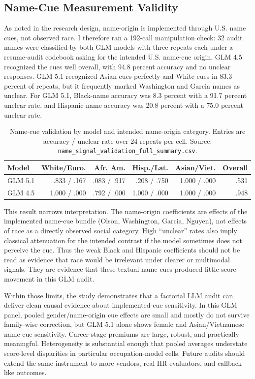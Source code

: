 \documentclass[10pt,twocolumn,letterpaper]{article}
\begin{document}
\subsection{Name-Cue Measurement Validity}

As noted in the research design, name-origin is implemented through U.S. name cues, not observed race. I therefore ran a 192-call manipulation check: 32 audit names were classified by both GLM models with three repeats each under a resume-audit codebook asking for the intended U.S. name-cue origin. GLM 4.5 recognized the cues well overall, with 94.8 percent accuracy and no unclear responses. GLM 5.1 recognized Asian cues perfectly and White cues in 83.3 percent of repeats, but it frequently marked Washington and Garcia names as unclear. For GLM 5.1, Black-name accuracy was 8.3 percent with a 91.7 percent unclear rate, and Hispanic-name accuracy was 20.8 percent with a 75.0 percent unclear rate.

\begin{table}[t]
\centering
\caption{Name-cue validation by model and intended name-origin category. Entries are accuracy / unclear rate over 24 repeats per cell. Source: \texttt{name\_signal\_validation\_full\_summary.csv}.}
\label{tab:namevalid}
\scriptsize
\begin{tabular}{lrrrrr}
\toprule
Model & White/Euro. & Afr. Am. & Hisp./Lat. & Asian/Viet. & Overall \\
\midrule
GLM 5.1 & .833 / .167 & .083 / .917 & .208 / .750 & 1.000 / .000 & .531 \\
GLM 4.5 & 1.000 / .000 & .792 / .000 & 1.000 / .000 & 1.000 / .000 & .948 \\
\bottomrule
\end{tabular}
\end{table}

This result narrows interpretation. The name-origin coefficients are effects of the implemented name-cue bundle (Olson, Washington, Garcia, Nguyen), not effects of race as a directly observed social category. High ``unclear'' rates also imply classical attenuation for the intended contrast if the model sometimes does not perceive the cue. Thus the weak Black and Hispanic coefficients should not be read as evidence that race would be irrelevant under clearer or multimodal signals. They are evidence that these textual name cues produced little score movement in this GLM audit.

Within those limits, the study demonstrates that a factorial LLM audit can deliver clean causal evidence about implemented-cue sensitivity. In this GLM panel, pooled gender/name-origin cue effects are small and mostly do not survive family-wise correction, but GLM 5.1 alone shows female and Asian/Vietnamese name-cue sensitivity. Career-stage premiums are large, robust, and practically meaningful. Heterogeneity is substantial enough that pooled averages understate score-level disparities in particular occupation-model cells. Future audits should extend the same instrument to more vendors, real HR evaluators, and callback-like outcomes.
\end{document}
